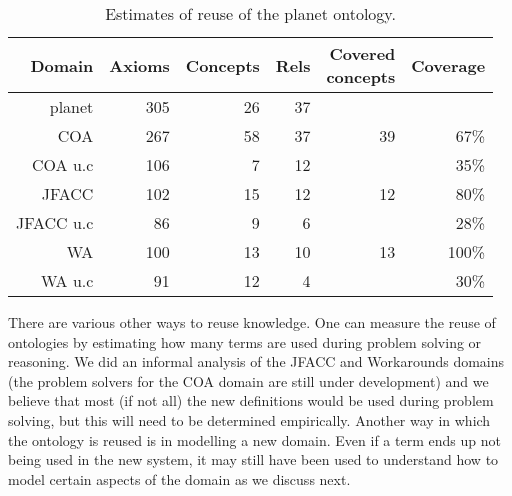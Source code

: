 \begin{table}[tb]
\begin{center}
\begin{tabular}{|r|r|r|r|r|r|}
\hline
{\scriptsize Domain} & {\scriptsize Axioms} & {\scriptsize Concepts}
 & {\scriptsize Rels} & {\scriptsize \parbox{4em}{Covered\\ concepts}} & 
{\scriptsize Coverage} \\
\hline
{\sc planet} & 305 & 26 & 37 & &\\
\hline
COA & 267 & 58 & 37 & 39 & 67\% \\
COA u.c & 106 & 7 & 12 & & 35\%\\
\hline
JFACC & 102 & 15 & 12 & 12 & 80\%\\
JFACC u.c & 86 & 9 & 6 & & 28\%\\
\hline
WA & 100 & 13 & 10 & 13 & 100\%\\
WA u.c & 91 & 12 & 4 & & 30\%\\
\hline
\end{tabular}
\end{center}
%
%
%
\caption{Estimates of reuse of the {\sc planet} ontology.}
\label{reuse}
\end{table}

There are various other ways to reuse knowledge.  
One can measure the 
reuse of ontologies 
by estimating how many terms are used during problem solving or 
reasoning.  
We did an 
informal analysis of the JFACC and Workarounds domains
(the problem solvers for 
the COA domain are still under development)
and we believe that most (if not all) the new definitions would be used 
during problem solving, but this will 
need to be determined empirically. 
Another way in which the ontology is reused is 
in modelling a new domain.  
Even if a term ends up not being used in the 
new system, it may still have been used to 
understand how to model certain aspects of the domain
as we discuss next.

